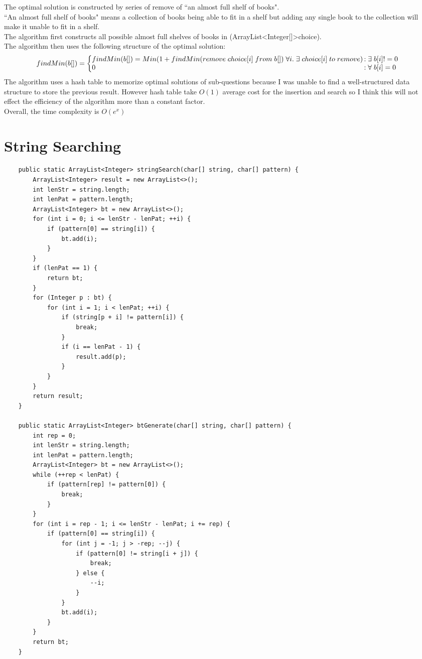 \documentclass[10pt,twoside,a4paper]{article}
\begin{document}
The optimal solution is constructed by series of remove of ``an almost full shelf of books".
\\``An almost full shelf of books" means a collection of books being able to fit in a shelf but adding any single book to the collection will make it unable to fit in a shelf.
\\The algorithm first constructs all possible almost full shelves of books in (ArrayList\textless Integer[]\textgreater choice).
\\The algorithm then uses the following structure of the optimal solution:
\[
findMin(b[]) = \left\{
\begin{array}{@{}l@{\thinspace}l}
\text{$findMin(b[]) = Min(1+findMin(remove\; choice[i]\; from\; b[])\; \forall i.\; \exists\;  choice[i]\; to\; remove)$} &: \text{$\exists\; b[i]!=0$}\\
\text{$0$} &: \text{$\forall\; b[i]=0$}\
\end{array}
\right.
\]
The algorithm uses a hash table to memorize optimal solutions of sub-questions because I was unable to find a well-structured data structure to store the previous result. However hash table take $O(1)$ average cost for the insertion and search so I think this will not effect the efficiency of the algorithm more than a constant factor.
\\Overall, the time complexity is $O(e^x)$
\section{String Searching}
\begin{lstlisting}
	public static ArrayList<Integer> stringSearch(char[] string, char[] pattern) {
		ArrayList<Integer> result = new ArrayList<>();
		int lenStr = string.length;
		int lenPat = pattern.length;
		ArrayList<Integer> bt = new ArrayList<>();
		for (int i = 0; i <= lenStr - lenPat; ++i) {
			if (pattern[0] == string[i]) {
				bt.add(i);
			}
		}
		if (lenPat == 1) {
			return bt;
		}
		for (Integer p : bt) {
			for (int i = 1; i < lenPat; ++i) {
				if (string[p + i] != pattern[i]) {
					break;
				}
				if (i == lenPat - 1) {
					result.add(p);
				}
			}
		}
		return result;
	}

	public static ArrayList<Integer> btGenerate(char[] string, char[] pattern) {
		int rep = 0;
		int lenStr = string.length;
		int lenPat = pattern.length;
		ArrayList<Integer> bt = new ArrayList<>();
		while (++rep < lenPat) {
			if (pattern[rep] != pattern[0]) {
				break;
			}
		}
		for (int i = rep - 1; i <= lenStr - lenPat; i += rep) {
			if (pattern[0] == string[i]) {
				for (int j = -1; j > -rep; --j) {
					if (pattern[0] != string[i + j]) {
						break;
					} else {
						--i;
					}
				}
				bt.add(i);
			}
		}
		return bt;
	}
\end{lstlisting}
\end{document}
